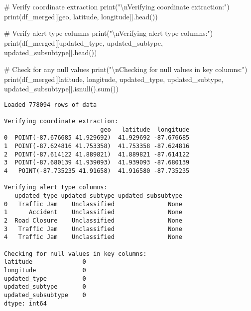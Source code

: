 \documentclass[
  letterpaper,
  DIV=11,
  numbers=noendperiod]{scrartcl}
\newenvironment{Shaded}{\begin{snugshade}}{\end{snugshade}}
\newcommand{\BuiltInTok}[1]{\textcolor[rgb]{0.00,0.23,0.31}{#1}}
\newcommand{\CharTok}[1]{\textcolor[rgb]{0.13,0.47,0.30}{#1}}
\newcommand{\CommentTok}[1]{\textcolor[rgb]{0.37,0.37,0.37}{#1}}
\newcommand{\NormalTok}[1]{\textcolor[rgb]{0.00,0.23,0.31}{#1}}
\newcommand{\StringTok}[1]{\textcolor[rgb]{0.13,0.47,0.30}{#1}}
\begin{document}
\begin{Shaded}
\begin{Highlighting}[]
\CommentTok{\# Verify coordinate extraction}
\BuiltInTok{print}\NormalTok{(}\StringTok{"}\CharTok{\textbackslash{}n}\StringTok{Verifying coordinate extraction:"}\NormalTok{)}
\BuiltInTok{print}\NormalTok{(df\_merged[[}\StringTok{\textquotesingle{}geo\textquotesingle{}}\NormalTok{, }\StringTok{\textquotesingle{}latitude\textquotesingle{}}\NormalTok{, }\StringTok{\textquotesingle{}longitude\textquotesingle{}}\NormalTok{]].head())}

\CommentTok{\# Verify alert type columns}
\BuiltInTok{print}\NormalTok{(}\StringTok{"}\CharTok{\textbackslash{}n}\StringTok{Verifying alert type columns:"}\NormalTok{)}
\BuiltInTok{print}\NormalTok{(df\_merged[[}\StringTok{\textquotesingle{}updated\_type\textquotesingle{}}\NormalTok{, }\StringTok{\textquotesingle{}updated\_subtype\textquotesingle{}}\NormalTok{, }\StringTok{\textquotesingle{}updated\_subsubtype\textquotesingle{}}\NormalTok{]].head())}

\CommentTok{\# Check for any null values}
\BuiltInTok{print}\NormalTok{(}\StringTok{"}\CharTok{\textbackslash{}n}\StringTok{Checking for null values in key columns:"}\NormalTok{)}
\BuiltInTok{print}\NormalTok{(df\_merged[[}\StringTok{\textquotesingle{}latitude\textquotesingle{}}\NormalTok{, }\StringTok{\textquotesingle{}longitude\textquotesingle{}}\NormalTok{, }\StringTok{\textquotesingle{}updated\_type\textquotesingle{}}\NormalTok{, }\StringTok{\textquotesingle{}updated\_subtype\textquotesingle{}}\NormalTok{, }\StringTok{\textquotesingle{}updated\_subsubtype\textquotesingle{}}\NormalTok{]].isnull().}\BuiltInTok{sum}\NormalTok{())}
\end{Highlighting}
\end{Shaded}

\begin{verbatim}
Loaded 778094 rows of data

Verifying coordinate extraction:
                           geo   latitude  longitude
0  POINT(-87.676685 41.929692)  41.929692 -87.676685
1  POINT(-87.624816 41.753358)  41.753358 -87.624816
2  POINT(-87.614122 41.889821)  41.889821 -87.614122
3  POINT(-87.680139 41.939093)  41.939093 -87.680139
4   POINT(-87.735235 41.91658)  41.916580 -87.735235

Verifying alert type columns:
   updated_type updated_subtype updated_subsubtype
0   Traffic Jam    Unclassified               None
1      Accident    Unclassified               None
2  Road Closure    Unclassified               None
3   Traffic Jam    Unclassified               None
4   Traffic Jam    Unclassified               None

Checking for null values in key columns:
latitude              0
longitude             0
updated_type          0
updated_subtype       0
updated_subsubtype    0
dtype: int64
\end{verbatim}
\end{document}
